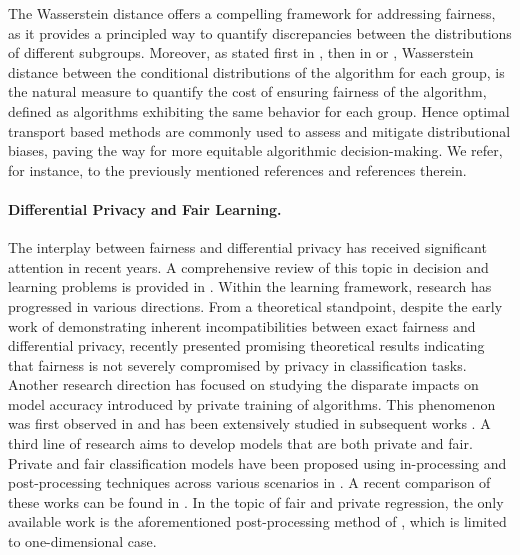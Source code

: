 The Wasserstein distance offers a compelling framework for addressing fairness, as it provides a principled way to quantify discrepancies between the distributions of different subgroups. Moreover, as stated first in \cite{feldman2015certifying}, then in \cite{gouic2020projection} or \cite{chzhen2020fair}, Wasserstein distance between the conditional distributions of the algorithm  for each group, is the natural  measure to quantify the cost of ensuring fairness of the algorithm, defined as algorithms exhibiting the same behavior for each group. Hence optimal transport based methods are commonly used to  assess and mitigate distributional biases, paving the way for more equitable algorithmic decision-making. We refer, for instance, to the previously mentioned references \cite{silvia2020general,gordaliza2019obtainingFairness} and references therein.


\paragraph{Differential Privacy and Fair Learning.}

The interplay between fairness and differential privacy has received significant attention in recent years. A comprehensive review of this topic in decision and learning problems is provided in \cite{fioretto2022DPandfairness}. Within the learning framework, research has progressed in various directions. From a theoretical standpoint, despite the early work of \cite{cummings2019compatibility} demonstrating inherent incompatibilities between exact fairness and differential privacy, \cite{mangold2023boundedimpact} recently presented promising theoretical results indicating that fairness is not severely compromised by privacy in classification tasks. Another research direction has focused on studying the disparate impacts on model accuracy introduced by private training of algorithms. This phenomenon was first observed in \cite{bagdasaryan2019disparateimpact} and has been extensively studied in subsequent works \cite{farrand2020neithePrivateNorFair,tran21fairnesslens,xu2021removingDisparateImpact,esipova2023gradientMisalignment}. A third line of research aims to develop models that are both private and fair. Private and fair classification models have been proposed using in-processing and post-processing techniques across various scenarios in \cite{xu2019achievingDPandFairness,jagielski2019differentially,ding2020differentially,lowi2022SDPfairLearning,yaghini2023learning,Ghoukasian2024DPFairBinaryClassif}. A recent comparison of these works can be found in \cite{Ghoukasian2024DPFairBinaryClassif}. 
In the topic of fair and private regression, the only available work is the aforementioned post-processing method of \cite{xian2024DPfairRegression}, which is limited to one-dimensional case.